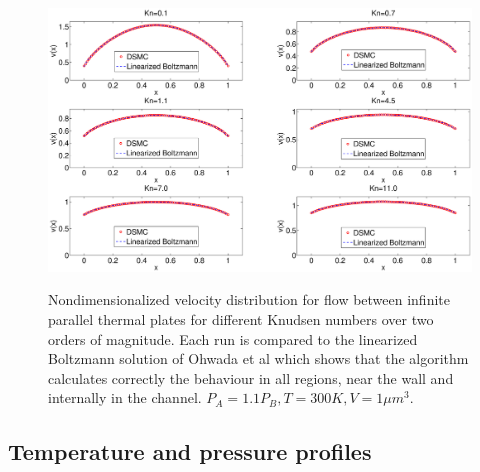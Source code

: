 \begin{figure}[h]
\includegraphics[width=\textwidth, trim=6cm 0cm 5cm 0cm, clip]{DSMC/figures/validation_poiseuille.eps}
\label{fig:dsmc_validation_poiseuille}
\centering
\caption{Nondimensionalized velocity distribution for flow between infinite parallel thermal plates for different Knudsen numbers over two orders of magnitude. Each run is compared to the linearized Boltzmann solution of Ohwada et al\cite{ohwada1989numerical} which shows that the algorithm calculates correctly the behaviour in all regions, near the wall and internally in the channel. $P_A = 1.1P_B, T=300K, V=1\mu m^3$.}
\end{figure}

\subsection{Temperature and pressure profiles}